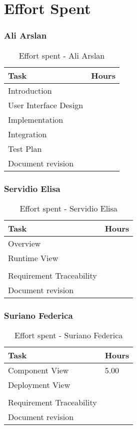 \chapter{Effort Spent}

\subsection{Ali Arslan}
\renewcommand{\arraystretch}{2}
\begin{longtable}{|m{9cm}|m{1.2cm}|}
\caption{Effort spent - Ali Arslan}\\
\hline
\endfirsthead
\endhead
\hline
\endlastfoot
\rowcolor{green2}
\textbf{Task} & \hfil {\textbf{Hours}}\\
\hline
Introduction & \hfil \\
User Interface Design & \hfil \\
Implementation & \hfil \\
Integration & \hfil \\
Test Plan & \hfil \\
Document revision & \hfil \\
\hline
\end{longtable}

\subsection{Servidio Elisa}
\renewcommand{\arraystretch}{2}
\begin{longtable}{|m{9cm}|m{1.2cm}|}
\caption{Effort spent - Servidio Elisa}\\
\hline
\endfirsthead
\endhead
\hline
\endlastfoot
\rowcolor{green2}
\textbf{Task} &\hfil {\textbf{Hours}}\\
\hline
Overview & \hfil \\
Runtime View & \hfil \\
 & \hfil \\
Requirement Traceability  & \hfil \\
Document revision & \hfil \\
\hline
\end{longtable}

\subsection{Suriano Federica}
\renewcommand{\arraystretch}{2}
\begin{longtable}{|m{9cm}|m{1.2cm}|}
\caption{Effort spent - Suriano Federica}\\
\hline
\endfirsthead
\endhead
\hline
\endlastfoot
\rowcolor{green2}
\textbf{Task} &\hfil {\textbf{Hours}}\\
\hline
Component View & \hfil 5.00 \\
Deployment View & \hfil \\
 & \hfil \\
Requirement Traceability  & \hfil \\
Document revision & \hfil \\
\hline
\end{longtable}
